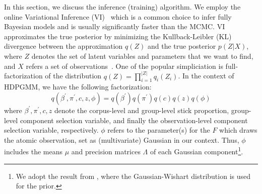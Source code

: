 \documentclass{article}
\begin{document}
In this section, we discuss the inference (training) algorithm. We employ the online Variational Inference (VI)~\cite{DBLP:journals/jmlr/WangPB11} which is a common choice to infer fully Bayesian models and is usually significantly faster than the MCMC. VI approximates the true posterior by minimizing the Kullback-Leibler (KL) divergence between the approximation $q(Z)$ and the true posterior $p(Z|X)$, where $Z$ denotes the set of latent variables and parameters that we want to find, and $X$ refers a set of observations~\cite{DBLP:journals/jei/BishopN07}.
One of the popular simpliciation is full-factorization of the distribution $q(Z) = \prod^{|Z|}_{i=1} q_{i}(Z_{i})$. In the context of HDPGMM, we have the following factorization:
\begin{equation}\label{eq:meanfield_vi_hdpgmm}
    q(\beta^{\prime}, \pi^{\prime}, c, z, \phi) = q(\beta^{\prime})q(\pi^{\prime})q(c)q(z)q(\phi)
\end{equation}
where $\beta^{\prime}, \pi^{\prime}, c, z$ denote the corpus-level and group-level stick proportion, group-level component selection variable, and finally the observation-level component selection variable, respectively. $\phi$ refers to the parameter(s) for the $F$ which draws the atomic observation, set as (multivariate) Gaussian in our context. Thus, $\phi$ includes the means $\mu$ and precision matrices $\Lambda$ of each Gaussian component\footnote{We adopt the result from \cite{DBLP:journals/jei/BishopN07}, where the Gaussian-Wishart distribution is used for the prior.}.
\end{document}
